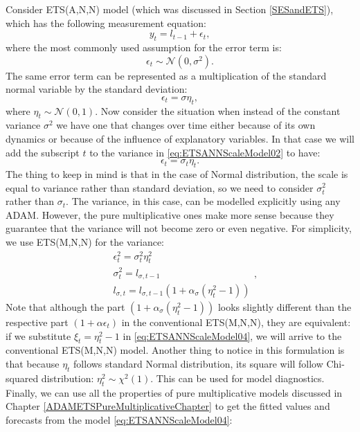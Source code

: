 \documentclass[]{book}
\theoremstyle{definition}
\theoremstyle{definition}
\theoremstyle{definition}
\theoremstyle{definition}
\theoremstyle{remark}
\begin{document}
Consider ETS(A,N,N) model (which was discussed in Section \ref{SESandETS}), which has the following measurement equation:
\begin{equation}
    y_t = l_{t-1} + \epsilon_t,
    \label{eq:ETSANNScaleModel01}
\end{equation}
where the most commonly used assumption for the error term is:
\begin{equation*}
    \epsilon_t \sim \mathcal{N}(0, \sigma^2) .
\end{equation*}
The same error term can be represented as a multiplication of the standard normal variable by the standard deviation:
\begin{equation}
    \epsilon_t = \sigma \eta_t,
    \label{eq:ETSANNScaleModel02}
\end{equation}
where \(\eta_t \sim \mathcal{N}(0, 1)\). Now consider the situation when instead of the constant variance \(\sigma^2\) we have one that changes over time either because of its own dynamics or because of the influence of explanatory variables. In that case we will add the subscript \(t\) to the variance in \eqref{eq:ETSANNScaleModel02} to have:
\begin{equation}
    \epsilon_t = \sigma_t \eta_t.
    \label{eq:ETSANNScaleModel03}
\end{equation}
The thing to keep in mind is that in the case of Normal distribution, the scale is equal to variance rather than standard deviation, so we need to consider \(\sigma_t^2\) rather than \(\sigma_t\). The variance, in this case, can be modelled explicitly using any ADAM. However, the pure multiplicative ones make more sense because they guarantee that the variance will not become zero or even negative. For simplicity, we use ETS(M,N,N) for the variance:
\begin{equation}
  \begin{aligned}
    &\epsilon_t^2 = \sigma_t^2 \eta_t^2 \\
    &\sigma_t^2 = l_{\sigma,t-1} \\
    &l_{\sigma,t} = l_{\sigma,t-1} \left(1 + \alpha_\sigma (\eta_t^2-1)\right)
  \end{aligned},
  \label{eq:ETSANNScaleModel04}
\end{equation}
Note that although the part \(\left(1 + \alpha_\sigma (\eta_t^2-1)\right)\) looks slightly different than the respective part \(\left(1 + \alpha \epsilon_t \right)\) in the conventional ETS(M,N,N), they are equivalent: if we substitute \(\xi_t = \eta_t^2-1\) in \eqref{eq:ETSANNScaleModel04}, we will arrive to the conventional ETS(M,N,N) model. Another thing to notice in this formulation is that because \(\eta_t\) follows standard Normal distribution, its square will follow Chi-squared distribution: \(\eta_t^2 \sim \chi^2(1)\). This can be used for model diagnostics. Finally, we can use all the properties of pure multiplicative models discussed in Chapter \ref{ADAMETSPureMultiplicativeChapter} to get the fitted values and forecasts from the model \eqref{eq:ETSANNScaleModel04}:
\end{document}
